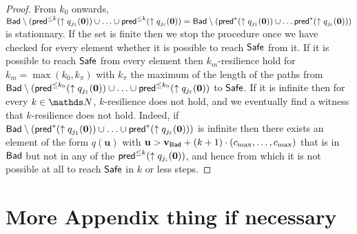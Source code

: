 \begin{proof}
From $k_0$ onwards,
$\textsf{Bad} \setminus (\textsf{pred}^{\leq k}(\uparrow q_{j_1}(\textbf{0}))\cup \ldots \cup \textsf{pred}^{\leq k}(\uparrow q_{j_\ell}(\textbf{0}))= 
\textsf{Bad} \setminus (\textsf{pred}^{*}(\uparrow q_{j_1}(\textbf{0})) \cup \ldots \textsf{pred}^{*}(\uparrow q_{j_\ell}(\textbf{0})) )$
is stationnary. 
If the set is finite then we stop the procedure once we have checked for every element
whether it is possible to reach $\textsf{Safe}$ from it.
If it is possible to reach $\textsf{Safe}$ from every element then {\sc $k_m$-resilience}
hold
for $k_m = \max(k_0, k_{\pi})$ with 
$k_{\pi}$ the maximum of the length of the paths from 
$\textsf{Bad} \setminus (\textsf{pred}^{\leq k_0}(\uparrow q_{j_1}(\textbf{0}))\cup \ldots \cup \textsf{pred}^{\leq k_0}(\uparrow q_{j_\ell}(\textbf{0}))$ to $\textsf{Safe}$.
If it is infinite then
for every $k \in \N$,
$k$-resilience does not hold, 
and we eventually find a witness that $k$-resilience does not hold.
Indeed, 
if
$\textsf{Bad} \setminus (\textsf{pred}^{*}(\uparrow q_{j_1}(\textbf{0})) \cup \ldots \cup \textsf{pred}^{*}(\uparrow q_{j_\ell}(\textbf{0})) )$
is
infinite
then
there exists an element of the form $q(\textbf{u} )$
with $\textbf{u} > \textbf{v}_{\textsf{Bad}} + (k+1) \cdot (c_{\max}, \ldots, c_{\max})$ 
that is in $\textsf{Bad}$ but not in any of the $\textsf{pred}^{\leq k}(\uparrow q_{j_i}(\textbf{0}))$,
and hence from which it is not possible at all to reach
$\textsf{Safe}$ in $k$ or less steps.
\end{proof}

\section{More Appendix thing if necessary}\label{appendix W}





